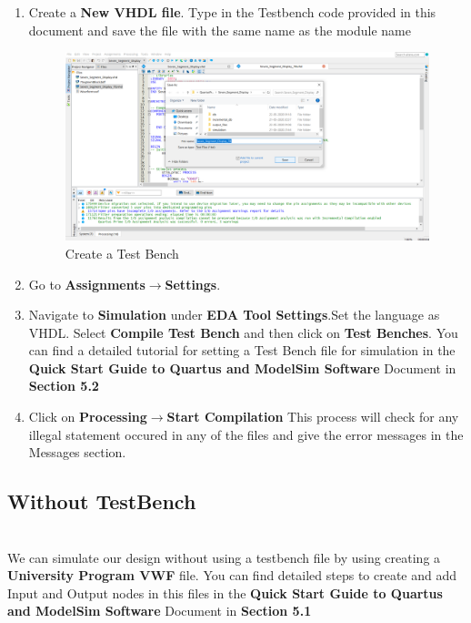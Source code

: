 \documentclass[12pt,singleside,a4paper]{article}
\begin{document}
 \begin{enumerate}
     \item Create a \textbf{New VHDL file}. Type in the Testbench code provided in this document and save the file with the same name as the module name
    \begin{figure}[H]
    \centering
    \includegraphics[width=12cm,keepaspectratio]{Project/Create11.png}
    \caption{Create a Test Bench}
    \end{figure}
   
    \item Go to \textbf{Assignments}$\rightarrow$\textbf{Settings}.
    
    \item Navigate to \textbf{Simulation} under \textbf{EDA Tool Settings}.Set the language as VHDL. Select \textbf{Compile Test Bench} and then click on \textbf{Test Benches}. You can find a detailed tutorial for setting a Test Bench file for simulation in the \textbf{Quick Start Guide to Quartus and ModelSim Software} Document in \textbf{\textbf{Section 5.2}}
    
    \item  Click on \textbf{Processing}$\rightarrow$\textbf{Start Compilation} 
    This process will check for any illegal statement occured in any of the files and give the error messages in the Messages section.
    
    
 \end{enumerate}
\subsection{Without TestBench}\\
 We can simulate our design without using a testbench file by using creating a \textbf{University Program VWF} file. You can find detailed steps to create and add Input and Output nodes in this files in the \textbf{Quick Start Guide to Quartus and ModelSim Software} Document in \textbf{Section 5.1}
  
\end{document}
